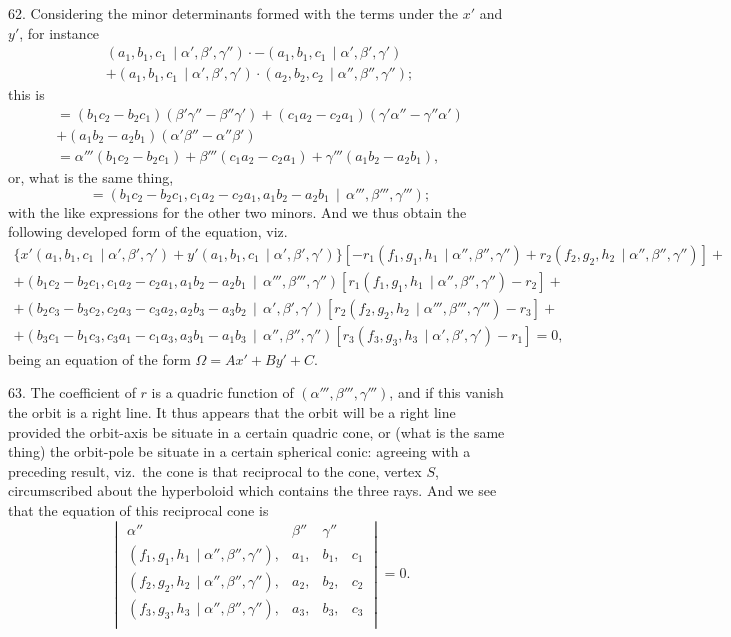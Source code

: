 \documentclass[11pt,a4paper]{article}
\theoremstyle{definition}
\begin{document}
62. Considering the minor determinants formed with the terms under the $x'$ and $y'$,
for instance
\begin{multline*}
(a_1,b_1,c_1\,\mid\alpha',\beta',\gamma'') \cdot -(a_1,b_1,c_1\,\mid\alpha',\beta',\gamma') \\
+ (a_1,b_1,c_1\,\mid\alpha',\beta',\gamma') \cdot (a_2,b_2,c_2\,\mid\alpha'',\beta'',\gamma'');
\end{multline*}
this is
\begin{multline*}
= (b_1c_2-b_2c_1)(\beta'\gamma''-\beta''\gamma') + (c_1a_2-c_2a_1)(\gamma'\alpha''-\gamma''\alpha')\\
+ (a_1b_2-a_2b_1)(\alpha'\beta''-\alpha''\beta') \\
= \alpha'''(b_1c_2-b_2c_1) + \beta'''(c_1a_2-c_2a_1) + \gamma'''(a_1b_2-a_2b_1),
\end{multline*}
or, what is the same thing,
\[
= (b_1c_2-b_2c_1, c_1a_2-c_2a_1, a_1b_2-a_2b_1 \,\mid\, \alpha''',\beta''',\gamma''');
\]
with the like expressions for the other two minors. And we thus obtain the following
developed form of the equation, viz.
\begin{multline*}
\{x'(a_1,b_1,c_1\,\mid\alpha',\beta',\gamma') + y'(a_1,b_1,c_1\,\mid\alpha',\beta',\gamma')\}
[-r_1(f_1,g_1,h_1\,\mid\alpha'',\beta'',\gamma'') + r_2(f_2,g_2,h_2\,\mid\alpha'',\beta'',\gamma'')] + \\
+ (b_1c_2-b_2c_1, c_1a_2-c_2a_1, a_1b_2-a_2b_1 \,\mid\, \alpha''',\beta''',\gamma'')
[r_1(f_1,g_1,h_1\,\mid\alpha'',\beta'',\gamma'') - r_2] + \\
+ (b_2c_3-b_3c_2, c_2a_3-c_3a_2, a_2b_3-a_3b_2 \,\mid\, \alpha',\beta',\gamma')
[r_2(f_2,g_2,h_2\,\mid\alpha''',\beta''',\gamma''') - r_3] + \\
+ (b_3c_1-b_1c_3, c_3a_1-c_1a_3, a_3b_1-a_1b_3 \,\mid\, \alpha'',\beta'',\gamma'')
[r_3(f_3,g_3,h_3\,\mid\alpha',\beta',\gamma') - r_1] = 0,
\end{multline*}
being an equation of the form $\Omega = Ax' + By' + C$.

63. The coefficient of $r$ is a quadric function of $(\alpha''',\beta''',\gamma''')$, and if this vanish the
orbit is a right line. It thus appears that the orbit will be a right line provided the
orbit-axis be situate in a certain quadric cone, or (what is the same thing) the orbit-pole
be situate in a certain spherical conic: agreeing with a preceding result, viz.~the cone is
that reciprocal to the cone, vertex $S$, circumscribed about the hyperboloid which contains
the three rays. And we see that the equation of this reciprocal cone is
\[
\begin{vmatrix}
\alpha'' & \beta'' & \gamma'' \\
(f_1,g_1,h_1\,\mid\alpha'',\beta'',\gamma''), & a_1, & b_1, & c_1 \\
(f_2,g_2,h_2\,\mid\alpha'',\beta'',\gamma''), & a_2, & b_2, & c_2 \\
(f_3,g_3,h_3\,\mid\alpha'',\beta'',\gamma''), & a_3, & b_3, & c_3 \\
\end{vmatrix} = 0.
\]
\end{document}
